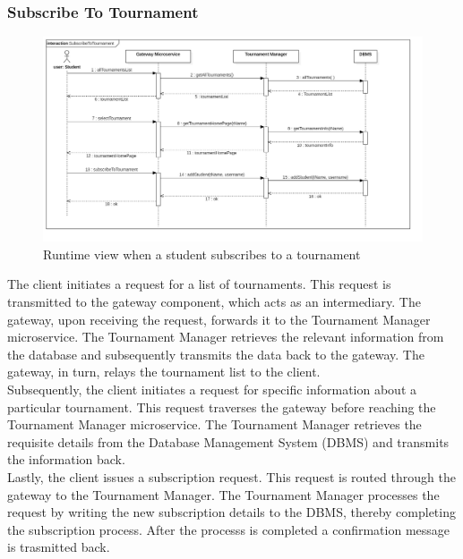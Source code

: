 \subsubsection*{Subscribe To Tournament}
\begin{figure}[h!]
    \centering
    \includegraphics[width=1\linewidth]{2.ArchitecturalDesign/res/subscribeToTournament.jpg}
    \caption{Runtime view when a student subscribes to a tournament}
    \label{fig:subsTournament}
\end{figure}

The client initiates a request for a list of tournaments. This request is transmitted to the gateway component, which acts as an intermediary.
The gateway, upon receiving the request, forwards it to the Tournament Manager microservice. The Tournament Manager retrieves the relevant information from the database and subsequently transmits the data back to the gateway.
The gateway, in turn, relays the tournament list to the client.\\
Subsequently, the client initiates a request for specific information about a particular tournament. This request traverses the gateway before reaching the Tournament Manager microservice. The Tournament Manager retrieves the requisite details from the Database Management System (DBMS) and transmits the information back.\\
Lastly, the client issues a subscription request. This request is routed through the gateway to the Tournament Manager. The Tournament Manager processes the request by writing the new subscription details to the DBMS, thereby completing the subscription process. After the processs is completed a confirmation message is trasmitted back.

\newpage

